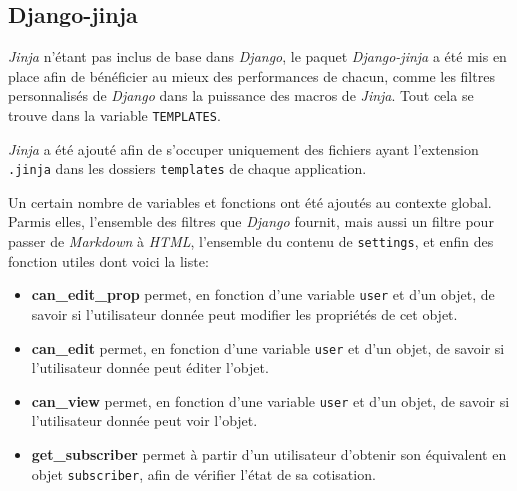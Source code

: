 \documentclass[a4paper]{report}
\begin{document}
\subsection{Django-jinja}
\label{sub:django_jinja}
\par \emph{Jinja} n'étant pas inclus de base dans \emph{Django}, le paquet \emph{Django-jinja} a été mis en place afin
de bénéficier au mieux des performances de chacun, comme les filtres personnalisés de \emph{Django} dans la puissance des
macros de \emph{Jinja}. Tout cela se trouve dans la variable \verb#TEMPLATES#.
\par \emph{Jinja} a été ajouté afin de s'occuper uniquement des fichiers ayant l'extension \verb#.jinja# dans les
dossiers \verb#templates# de chaque application.
\par Un certain nombre de variables et fonctions ont été ajoutés au contexte global. Parmis elles, l'ensemble des
filtres que \emph{Django} fournit, mais aussi un filtre pour passer de \emph{Markdown} à \emph{HTML}, l'ensemble du
contenu de \verb#settings#, et enfin des fonction utiles dont voici la liste:
\begin{itemize}
    \item \textbf{can\_edit\_prop} permet, en fonction d'une variable \verb#user# et d'un objet, de savoir si
        l'utilisateur donnée peut modifier les propriétés de cet objet.
    \item \textbf{can\_edit} permet, en fonction d'une variable \verb#user# et d'un objet, de savoir si
        l'utilisateur donnée peut éditer l'objet.
    \item \textbf{can\_view} permet, en fonction d'une variable \verb#user# et d'un objet, de savoir si
        l'utilisateur donnée peut voir l'objet.
    \item \textbf{get\_subscriber} permet à partir d'un utilisateur d'obtenir son équivalent en objet \verb#subscriber#,
        afin de vérifier l'état de sa cotisation.
\end{itemize}
\end{document}
